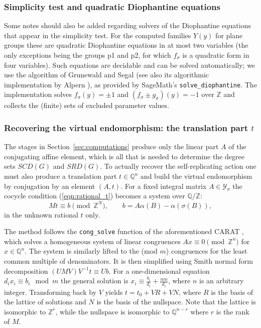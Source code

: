 \documentclass[draft]{adm-paper}
\theoremstyle{definition}
\begin{document}
\subsubsection*{Simplicity test and quadratic Diophantine equations}

Some notes should also be added regarding solvers of the Diophantine equations that appear in the simplicity test.
For the computed families $Y(y)$ for plane groups these are quadratic Diophantine equations in at most two variables
(the only exceptions being the groups p1 and p2, for which $f_\sigma$ is a quadratic form in four variables).
Such equations are decidable and can be solved automatically; we use the algorithm of Grunewald and Segal \cite{quadratic_polys}
(see also its algorithmic implementation by Alpern \cite{AlpernDiophantine}), as provided by SageMath's
\texttt{solve\_diophantine}. The implementation solves $f_\sigma(y) = \pm 1$ and
$(f_\sigma \pm g_\sigma)(y) = -1$ over $\mathbb{Z}$ and collects the (finite) sets of excluded parameter values.

\subsubsection*{Recovering the virtual endomorphism: the translation part $t$}
The stages in Section~\ref{sec:computations} produce only the linear part $A$ of the
conjugating affine element, which is all that is needed to determine the degree sets $SCD(G)$ and $SRD(G)$.
To actually recover the self-replicating action one must also produce a translation part $t \in \mathbb{Q}^n$
and build the virtual endomorphism by conjugation by an element $(A,t)$. For a fixed integral matrix
$A \in \mathcal{Y}_\sigma$ the cocycle condition (\ref{eqn:rational_t}) becomes
a system over $\mathbb{Q}/\mathbb{Z}$:
\[
M t \equiv b \pmod{\mathbb{Z}^N},
\qquad b = A\alpha(B) - \alpha(\sigma(B)),
\]
in the unknown rational $t$ only.

The method follows the \texttt{cong\_solve} function of the aforementioned CARAT \cite{CARAT,Algo:Cocycle}, which solves a
homogeneous system of linear congruences $A x \equiv 0 \pmod{\mathbb{Z}^n}$ for $x \in \mathbb{Q}^n$.
The system is similarly lifted to the (mod $m$) congruences for the least common multiple of denominators.
It is then simplified using Smith normal form decomposition $(UMV) V^{-1}t \equiv Ub$. For a one-dimensional
equation $d_i x_i \equiv b_i \mod m$ the general solution is $x_i \equiv \frac{b_i}{d_i} + \frac{nm}{d_i}$, where $n$
is an arbitrary integer. Transforming back by $V$ yields $t = t_0 + V R + V N$, where $R$ is the basis of the lattice
of solutions and $N$ is the basis of the nullspace. Note that the lattice is isomorphic to $\mathbb{Z}^r$,
while the nullspace is isomorphic to $\mathbb{Q}^{n-r}$ where $r$ is the rank of $M$.
\end{document}
